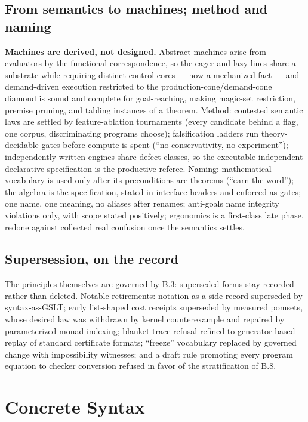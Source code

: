 \documentclass[11pt]{article}
\begin{document}
\subsection{From semantics to machines; method and naming}
\textbf{Machines are derived, not designed.}  Abstract machines arise
from evaluators by the functional correspondence, so the eager and lazy
lines share a substrate while requiring distinct control cores --- now a
mechanized fact --- and demand-driven execution restricted to the
production-cone/demand-cone diamond is sound and complete for
goal-reaching, making magic-set restriction, premise pruning, and tabling
instances of a theorem.  Method: contested semantic laws are settled by
feature-ablation tournaments (every candidate behind a flag, one corpus,
discriminating programs choose); falsification ladders run
theory-decidable gates before compute is spent (``no conservativity, no
experiment''); independently written engines share defect classes, so the
executable-independent declarative specification is the productive
referee.  Naming: mathematical vocabulary is used only after its
preconditions are theorems (``earn the word''); the algebra is the
specification, stated in interface headers and enforced as gates; one
name, one meaning, no aliases after renames; anti-goals name integrity
violations only, with scope stated positively; ergonomics is a
first-class late phase, redone against collected real confusion once the
semantics settles.

\subsection{Supersession, on the record}
The principles themselves are governed by B.3: superseded forms stay
recorded rather than deleted.  Notable retirements: notation as a
side-record superseded by syntax-as-GSLT; early list-shaped cost receipts
superseded by measured pomsets, whose desired law was withdrawn by
kernel counterexample and repaired by parameterized-monad indexing;
blanket trace-refusal refined to generator-based replay of standard
certificate formats; ``freeze'' vocabulary replaced by governed change
with impossibility witnesses; and a draft rule promoting every program
equation to checker conversion refused in favor of the stratification of
B.8.


\section{Concrete Syntax}
\label{app:grammar}
\end{document}
